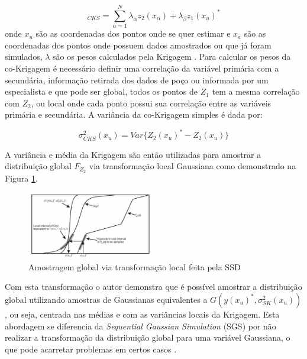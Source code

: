 \begin{equation}
[Z_{2}(x_{u})^{*}]_{CKS}=\sum_{\alpha=1}^N\lambda_{\alpha}z_{2}(x_{\alpha})+\lambda_{\beta}z_{1}(x_{u})^{*}
\end{equation}
onde $x_u$ são as coordenadas dos pontos onde se quer estimar e $x_a$ são as
coordenadas dos pontos onde possuem dados amostrados ou que já foram simulados,
$\lambda$ são os pesos calculados pela Krigagem \citep[p.
169]{goovaerts1997geostatistics}. Para calcular os pesos da co-Krigagem é
necessário definir uma correlação da variável primária com a secundária,
informação retirada dos dados de poço ou informada por um especialista e que
pode ser global, todos os pontos de $Z_1$ tem a mesma correlação com $Z_2$, ou
local onde cada ponto possui sua correlação entre as variáveis primária e
secundária. A variância da co-Krigagem simples é dada por:

\begin{equation}
\sigma^2_{CKS}(x_{u})=Var\{ Z_2(x_u)^* -Z_2(x_u)\}
\end{equation}

A variância e média da Krigagem são então utilizadas para amostrar a
distribuição global $F_{Z_2}$ via transformação local Gaussiana como
demonstrado na Figura \ref{fig:transfdss}.

\begin{figure}[!htp]
\begin{center}
  \includegraphics[width=0.5\textwidth]{fig/transfdss}
  \caption{Amostragem global via transformação local feita pela SSD
  \citep{2001amilcarDSS}}
  \label{fig:transfdss}
\end{center}
\end{figure}


Com esta transformação o autor demonstra que é possível amostrar a distribuição
global utilizando amostras de Gaussianas equivalentes a
$G(y(x_u)^*,\sigma^2_{SK}(x_u))$, ou seja, centrada nas médias e com as
variâncias locais da Krigagem. Esta abordagem se diferencia da
\textit{Sequential Gaussian Simulation} (SGS) por não realizar a transformação
da distribuição global para uma variável Gaussiana, o que pode acarretar
problemas em certos casos \citep{2001amilcarDSS}.

